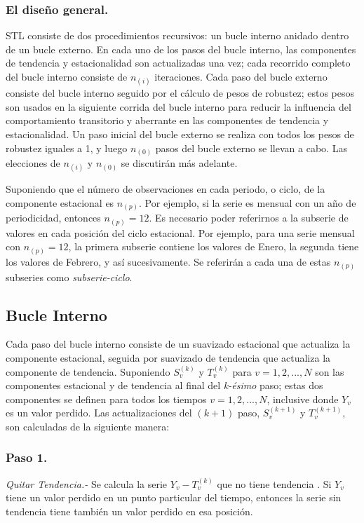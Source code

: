 \documentclass[12pt,oneside]{book}\usepackage[]{graphicx}\usepackage[]{color}
\theoremstyle{definition} %
\begin{document}
\subsubsection{El diseño general.}

STL consiste de dos procedimientos recursivos: un bucle interno anidado dentro de un bucle externo. En cada uno de los pasos del bucle interno, las componentes de tendencia y estacionalidad son actualizadas una vez; cada recorrido completo del bucle interno consiste de $n_{(i)}$ iteraciones. Cada paso del bucle externo consiste del bucle interno seguido por el cálculo de pesos de robustez; estos pesos son usados en la siguiente corrida del bucle interno para reducir la influencia del comportamiento transitorio y aberrante en las componentes de tendencia y  estacionalidad. Un paso inicial del bucle externo se realiza con todos los pesos de robustez iguales a 1, y luego $n_{(0)}$ pasos del bucle externo se llevan a cabo. Las elecciones de $n_{(i)}$ y $n_{(0)}$ se discutirán más adelante. 

Suponiendo que el número de observaciones en cada periodo, o ciclo, de la componente estacional es $n_{(p)}$. Por ejemplo, si la serie es mensual con un año de periodicidad, entonces $n_{(p)}=12$. Es necesario poder referirnos a la subserie de valores en cada posición del ciclo estacional. Por ejemplo, para una serie mensual con $n_{(p)}=12$, la primera subserie contiene los valores de Enero, la segunda tiene los valores de Febrero, y así sucesivamente. Se referirán a cada una de estas $n_{(p)}$ subseries como \textit{subserie-ciclo}.

\subsection{Bucle Interno}

Cada paso del bucle interno consiste de un suavizado estacional que actualiza la componente estacional, seguida por suavizado de tendencia que actualiza la componente de tendencia. Suponiendo $S_v^{(k)}$ y $T_v^{(k)}$ para $v=1,2,...,N$ son las componentes estacional y de tendencia al final del \textit{k-ésimo} paso; estas dos componentes se definen para todos los tiempos $v=1,2,...,N$, inclusive donde $Y_v$ es un valor perdido. Las actualizaciones del $(k+1)$ paso, $S_v^{(k+1)}$ y $T_v^{(k+1)}$, son calculadas de la siguiente manera:

\subsubsection{Paso 1.} \textit{Quitar Tendencia.-}
\label{sbsec:paso1}
Se calcula la serie $Y_v-T_v^{(k)}$ que no tiene tendencia . Si $Y_v$ tiene un valor perdido en un punto particular del tiempo, entonces la serie sin tendencia tiene también un valor perdido en esa posición.
\end{document}
